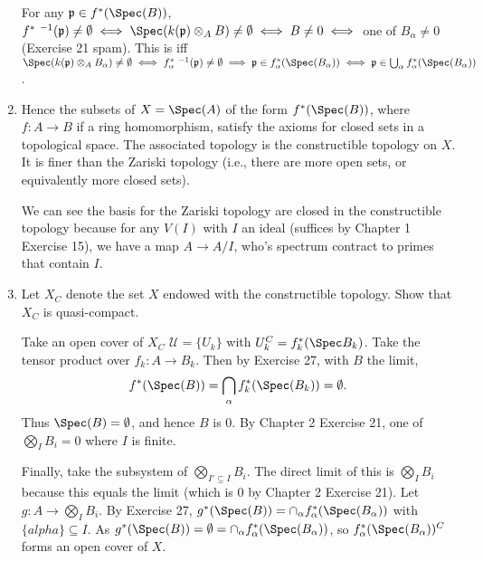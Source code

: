 \begin{questions}
\begin{enumerate}
\begin{solution}
	For any $\mathfrak{p} \in f^\ast(\Spec(B)) $, $f^\ast\ ^{-1}(\mathfrak{p}) \ne \emptyset \iff \Spec(k(\mathfrak{p}) \otimes _A B) \ne \emptyset \iff B \ne 0 \iff $ one of $B_ \alpha \ne 0$ (Exercise 21 spam).
	This is iff $\Spec(k(\mathfrak{p}) \otimes _A B_ \alpha) \ne \emptyset \iff f_ \alpha^\ast\ ^{-1}(\mathfrak{p}) \ne \emptyset \implies \mathfrak{p} \in f_ \alpha^\ast(\Spec(B_ \alpha)) \iff \mathfrak{p} \in \bigcup_{\alpha} f_ \alpha^\ast(\Spec(B_ \alpha))$.
\end{solution}
\item Hence the subsets of $X = \Spec(A) $ of the form $f^\ast(\Spec(B)) $, where $f:A\to B $ if a ring homomorphism, satisfy the axioms for closed sets in a topological space. The associated topology is the constructible topology on $X $. It is finer than the Zariski topology (i.e., there are more open sets, or equivalently more closed sets).
\begin{solution}
	We can see the basis for the Zariski topology are closed in the constructible topology because for any $V(I) $ with $I $ an ideal (suffices by Chapter 1 Exercise 15), we have a map $A \to A / I $, who's spectrum contract to primes that contain $I $.
\end{solution}
\item Let $X_C $ denote the set $X $ endowed with the constructible topology. Show that $X_C $ is quasi-compact.
\begin{solution}
	Take an open cover of $X_C $ $\mathcal{U} = \{U_k\}$ with $U_k^C = f_k^\ast(\Spec B_k) $.
	Take the tensor product over $f_k: A\to B_k $.
	Then by Exercise 27, with $B$ the limit,
	\[
		f^\ast(\Spec(B)) = \bigcap_{\alpha} f^\ast_{k}(\Spec(B_k)) = \emptyset
	.\] 
	Thus $\Spec(B) = \emptyset$, and hence $B $ is 0.
	By Chapter 2 Exercise 21, one of $\bigotimes_I B_i = 0 $ where $I $ is finite.

	Finally, take the subsystem of $\bigotimes_{I' \subseteq I}B_i $.
	The direct limit of this is $\bigotimes_I B_i $ because this equals the limit (which is 0 by Chapter 2 Exercise 21).
	Let $g: A\to \bigotimes_I B_i $.
	By Exercise 27, $g^\ast (\Spec(B)) = \cap_{\alpha} f^\ast_ \alpha(\Spec(B_ \alpha))$ with $\{alpha\}\subseteq I $.
	As $g^\ast(\Spec(B)) = \emptyset = \cap_{\alpha} f^\ast_ \alpha(\Spec(B_ \alpha))$, so $f_ \alpha^\ast(\Spec(B_{ \alpha}))^C $ forms an open cover of $X $.
\end{solution}
\end{enumerate}


\end{questions}

